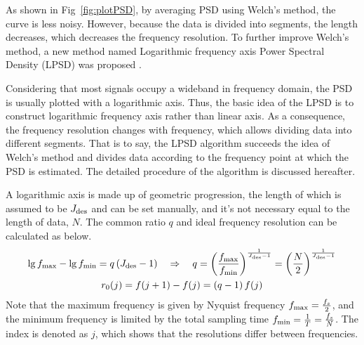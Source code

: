 As shown in Fig~\ref{fig:plotPSD}, by averaging PSD using Welch's method, the curve is less noisy. However, because the data is divided into segments, the length decreases, which decreases the frequency resolution. To further improve Welch's method, a new method named Logarithmic frequency axis Power Spectral Density (LPSD) was proposed \cite{LPSD}.


Considering that most signals occupy a wideband in frequency domain, the PSD is usually plotted with a logarithmic axis. Thus, the basic idea of the LPSD is to construct logarithmic frequency axis rather than linear axis. As a consequence, the frequency resolution changes with frequency, which allows dividing data into different segments. That is to say, the LPSD algorithm succeeds the idea of Welch's method and divides data according to the frequency point at which the PSD is estimated. The detailed procedure of the algorithm is discussed hereafter.


A logarithmic axis is made up of geometric progression, the length of which is assumed to be $J_{\rm des}$ and can be set manually, and it's not necessary equal to the length of data, $N$. The common ratio $q$ and ideal frequency resolution can be calculated as below.
\begin{gather}
    \lg f_{\rm max} - \lg f_{\rm min} = q\left(J_{\rm des} -1 \right) \quad \Rightarrow \quad q = \left(\frac{f_{\rm max}}{f_{\rm min}}\right)^{\frac{1}{J_{\rm des} -1}} = \left(\frac{N}{2}\right)^{\frac{1}{J_{\rm des} -1}} \\
    r_0(j) = f(j+1) - f(j) = \left(q-1\right) f(j)
    \label{eq:r0}
\end{gather}
Note that the maximum frequency is given by Nyquist frequency $f_{\rm max} = \frac{f_s}{2}$, and the minimum frequency is limited by the total sampling time $f_{\rm min} = \frac{1}{T} = \frac{f_s}{N}$. The index is denoted as $j$, which shows that the resolutions differ between frequencies.


